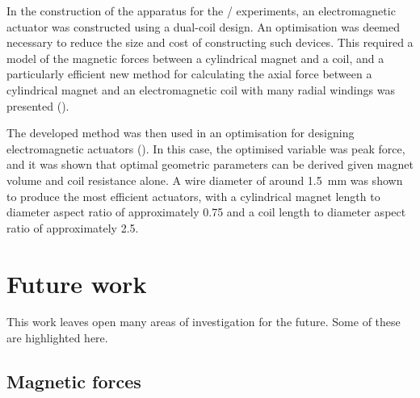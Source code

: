 \documentclass[11pt,a4paper]{memoir}
\begin{document}
In the construction of the apparatus for the \qzs/ experiments, an electromagnetic actuator was constructed using a dual-coil design.
An optimisation was deemed necessary to reduce the size and cost of constructing such devices.
This required a model of the magnetic forces between a cylindrical magnet and a coil, and a particularly efficient new method for calculating the axial force between a cylindrical magnet and an electromagnetic coil with many radial windings was presented ().

The developed method was then used in an optimisation for designing electromagnetic actuators ().
In this case, the optimised variable was peak force, and it was shown that optimal geometric parameters can be derived given magnet volume and coil resistance alone.
A wire diameter of around \SI{1.5}{mm} was shown to produce the most efficient actuators, with a cylindrical magnet length to diameter aspect ratio of approximately \num{0.75} and a coil length to diameter aspect ratio of approximately \num{2.5}.

\section{Future work}

This work leaves open many areas of investigation for the future.
Some of these are highlighted here.

\subsection{Magnetic forces}
\end{document}
